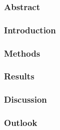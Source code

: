 \subsubsection{Abstract}
\subsubsection{Introduction}
\subsubsection{Methods}
\subsubsection{Results}

\subsubsection{Discussion}

\subsubsection{Outlook}
\FloatBarrier
